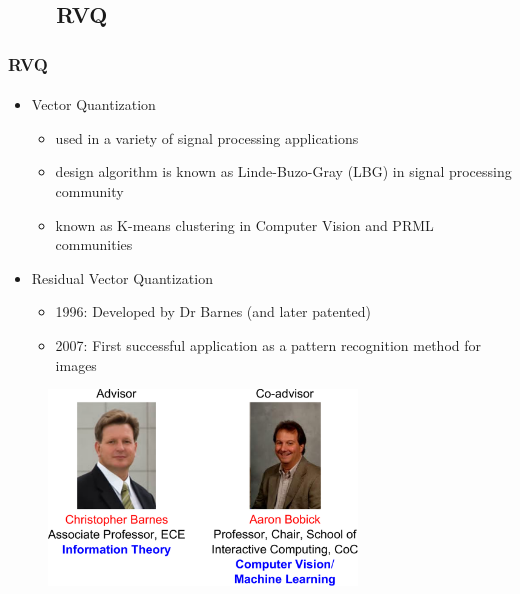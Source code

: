 \subsection{\ \ \ \ RVQ}

\begin{frame}
\frametitle{RVQ}
\framesubtitle{}
\mypagenum{}
\vspace{0.2in}
\begin{itemize}\scriptsize
\item {\color{red}Vector Quantization}
\begin{itemize}\scriptsize
\item used in a variety of signal processing applications
\item design algorithm is known as Linde-Buzo-Gray (LBG) in signal processing community
\item known as K-means clustering in Computer Vision and PRML communities
\end{itemize}
\item {\color{red}Residual Vector Quantization}
\begin{itemize}\scriptsize
\item 1996: Developed by Dr Barnes (and later patented)
\item 2007: First successful application as a pattern recognition method for images
\end{itemize}
\end{itemize}
\begin{figure}
\includegraphics[width=0.73\textwidth]{thesis/professors.pdf}
\end{figure}
\end{frame}


